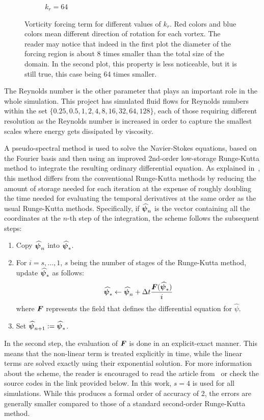 \documentclass[../main.tex]{subfiles}
\begin{document}
\begin{figure}[ht]
\begin{subfigure}{0.44\textwidth}
		\caption{$k_r = 64$}
	\end{subfigure}
	\caption{Vorticity forcing term for different values of $k_r$. Red colors and blue colors mean different direction of rotation for each vortex. The reader may notice that indeed in the first plot the diameter of the forcing region is about 8 times smaller than the total size of the domain. In the second plot, this property is less noticeable, but it is still true, this case being 64 times smaller.}\label{fig:forcing}
\end{figure}

The Reynolds number is the other parameter that plays an important role in the whole simulation. This project has simulated fluid flows for Reynolds numbers within the set $\{0.25, 0.5, 1, 2, 4, 8, 16, 32, 64, 128\}$, each of those requiring different resolution as the Reynolds number is increased in order to capture the smallest scales where energy gets dissipated by viscosity.

A pseudo-spectral method is used to solve the Navier-Stokes equations, based on the Fourier basis and then using an improved 2nd-order low-storage Runge-Kutta method to integrate the resulting ordinary differential equation. As explained in~\cite{rungekutta}, this method differs from the conventional Runge-Kutta methods by reducing the amount of storage needed for each iteration at the expense of roughly doubling the time needed for evaluating the temporal derivatives at the same order as the usual Runge-Kutta methods. Specifically, if $\boldsymbol{\widehat{\psi}}_n$ is the vector containing all the coordinates at the $n$-th step of the integration, the scheme follows the subsequent steps:
\begin{enumerate}
	\item Copy $\boldsymbol{\widehat\psi}_n$ into $\boldsymbol{\widehat\psi}_*$.
	\item For $i = s, \ldots, 1$, $s$ being the number of stages of the Runge-Kutta method, update $\boldsymbol{\widehat\psi}_*$ as follows:
	      \begin{equation}
		      \boldsymbol{\widehat\psi}_* \leftarrow \boldsymbol{\widehat\psi}_n + \Delta t \frac{\boldsymbol{F}(\boldsymbol{\widehat\psi}_*)}{i}
	      \end{equation}
	      where $\boldsymbol{F}$ represents the field that defines the differential equation for ${\widehat\psi}$.
	\item Set $\boldsymbol{\widehat\psi}_{n+1} := \boldsymbol{\widehat\psi}_*$.
\end{enumerate}
In the second step, the evaluation of $\boldsymbol{F}$ is done in an explicit-exact manner. This means that the non-linear term is treated explicitly in time, while the linear terms are solved exactly using their exponential solution. For more information about the scheme, the reader is encouraged to read the article from~\cite{rungekutta} or check the source codes in the link provided below. In this work, $s=4$ is used for all simulations. While this produces a formal order of accuracy of 2, the errors are generally smaller compared to those of a standard second-order Runge-Kutta method.
\end{document}
